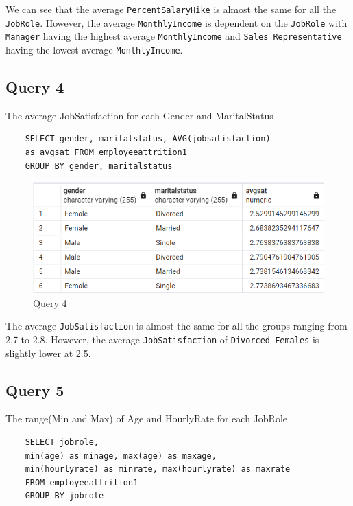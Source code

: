 \documentclass[12pt]{article}
\begin{document}
We can see that the average \texttt{PercentSalaryHike} is almost the same for
all the \texttt{JobRole}. However, the average \texttt{MonthlyIncome} is
dependent on the \texttt{JobRole} with \texttt{Manager} having the highest
average \texttt{MonthlyIncome} and \texttt{Sales Representative} having the
lowest average \texttt{MonthlyIncome}.

\subsection{Query 4}
The average JobSatisfaction for each Gender and MaritalStatus
\begin{verbatim}
    SELECT gender, maritalstatus, AVG(jobsatisfaction)
    as avgsat FROM employeeattrition1
    GROUP BY gender, maritalstatus
\end{verbatim}

\begin{figure}[H]
    \centering
    \includegraphics[width=1\textwidth]{images/query4.png}
    \caption{Query 4}
    \label{fig:query4}
\end{figure}

The average \texttt{JobSatisfaction} is almost the same for all the groups
ranging from 2.7 to 2.8. However, the average \texttt{JobSatisfaction} of
\texttt{Divorced Females} is slightly lower at 2.5.

\subsection{Query 5}
The range(Min and Max) of Age and HourlyRate for each JobRole
\begin{verbatim}
    SELECT jobrole,
    min(age) as minage, max(age) as maxage,
    min(hourlyrate) as minrate, max(hourlyrate) as maxrate
    FROM employeeattrition1
    GROUP BY jobrole
\end{verbatim}
\end{document}
